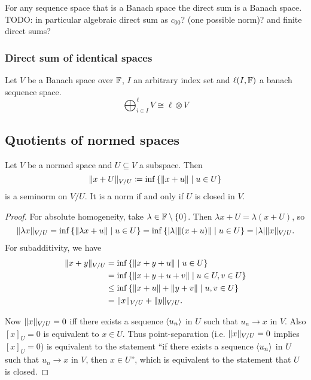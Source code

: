 \begin{proposition}
For any sequence space that is a Banach space the direct sum is a Banach space. TODO: in particular algebraic direct sum as $c_{00}$? (one possible norm)? and finite direct sums?
\end{proposition}

\subsubsection{Direct sum of identical spaces}
\begin{proposition}
Let $V$ be a Banach space over $\mathbb{F}$, $I$ an arbitrary index set and $\ell(I,\mathbb{F})$ a banach sequence space.
\[ \bigoplus_{i\in I}^\ell V \cong \ell\otimes V \]
\end{proposition}


\subsection{Quotients of normed spaces}
\begin{proposition}
Let $V$ be a normed space and $U\subseteq V$ a subspace. Then
\[ \norm{x+U}_{V/U} \defeq \inf\setbuilder{\norm{x+u}}{u\in U} \]
is a seminorm on $V/U$. It is a norm \textup{if and only if} $U$ is closed in $V$.
\end{proposition}
\begin{proof}
For absolute homogeneity, take $\lambda\in\mathbb{F}\setminus\{0\}$. Then $\lambda x+U = \lambda(x+U)$, so
\[ \norm{\lambda x}_{V/U} = \inf\setbuilder{\norm{\lambda x+u}}{u\in U} = \inf\setbuilder{|\lambda|\norm{(x+u)}}{u\in U} = |\lambda| \norm{x}_{V/U}. \]
For subadditivity, we have
\begin{align*}
\norm{x+y}_{V/U} &= \inf\setbuilder{\norm{x+y+u}}{u\in U} \\
&= \inf\setbuilder{\norm{x+y+u+v}}{u\in U, v\in U} \\
&\leq \inf\setbuilder{\norm{x+u}+\norm{y+v}}{u,v\in U} \\
&= \norm{x}_{V/U} + \norm{y}_{V/U}.
\end{align*}

Now $\lVert x\rVert_{V/U} = 0$ iff there exists a sequence $\left\langle u_n \right\rangle$ in $U$ such that $u_n\to x$ in $V$. Also $[x]_U = 0$ is equivalent to $x\in U$. Thus point-separation (i.e. $\lVert x\rVert_{V/U} = 0$ implies $[x]_U = 0$) is equivalent to the statement ``if there exists a sequence $\left\langle u_n \right\rangle$ in $U$ such that $u_n\to x$ in $V$, then $x\in U$'', which is equivalent to the statement that $U$ is closed.
\end{proof}

